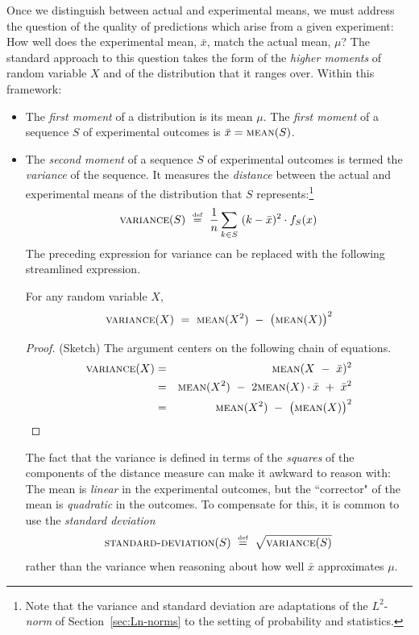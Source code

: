  

\smallskip

Once we distinguish between actual and experimental means, we must address the question of the quality of predictions which arise from a given experiment:  How well does the experimental mean, $\bar{x}$, match the actual mean, $\mu$?  The standard approach to this question takes the form of the {\em higher moments} of random variable $X$ and of the distribution that it ranges over.  Within this framework:
\begin{itemize}
\item
The {\em first moment} of a distribution is its mean $\mu$.  The  {\em first moment} of a sequence $S$ of experimental outcomes is $\bar{x}  =  \mbox{\sc mean}(S)$.
\medskip\item
The {\em second moment} of a sequence $S$ of experimental outcomes is termed the {\it variance} of the sequence.   It measures the {\em distance} between the actual and experimental means of the distribution that $S$ represents:\footnote{Note that the variance and standard deviation are adaptations of the $L^2$-{\it norm} of Section~\ref{sec:Ln-norms} to the setting of probability and statistics.}
\[  \mbox{\sc variance}(S) \ \stackrel{\mbox{{\tiny def}}}{=} \ {1 \over n} \sum_{k \in S} \ (k - \bar{x})^2 \cdot f_S(x) \]
The preceding expression for variance can be replaced with the following streamlined expression.

\begin{prop}
\label{thm:variance-formula}
For any random variable $X$,
\[ \mbox{\sc variance}(X) \ = \ \mbox{\sc mean}(X^2) \ - \ \big(\mbox{\sc mean}(X)\big)^2 \]
\end{prop}

\begin{proof}{(Sketch)}
The argument centers on the following chain of equations.
\begin{eqnarray*}
\mbox{\sc variance}(X) & = &
  \mbox{\sc mean}(X \ - \ \bar{x})^2 \\
 & = &
\mbox{\sc mean}(X^2) \ - \ 2 \mbox{\sc mean}(X) \cdot \bar{x} \ + \ \bar{x}^2 \\
 & = &
\mbox{\sc mean}(X^2) \ - \ \big(\mbox{\sc mean}(X)\big)^2
\end{eqnarray*}
\end{proof}

The fact that the variance is defined in terms of the {\em squares} of the components of the distance measure can make it awkward to reason with:  The mean is {\em linear} in the experimental outcomes, but the ``corrector" of the mean is {\em quadratic} in the outcomes.  To compensate for this, it is common to use the {\it standard deviation}
\[ \mbox{\sc standard-deviation}(S) \ \eqdef \ \sqrt{\mbox{\sc variance}(S)} \]
rather than the variance when reasoning about how well $\bar{x}$ approximates $\mu$.


\end{itemize}

